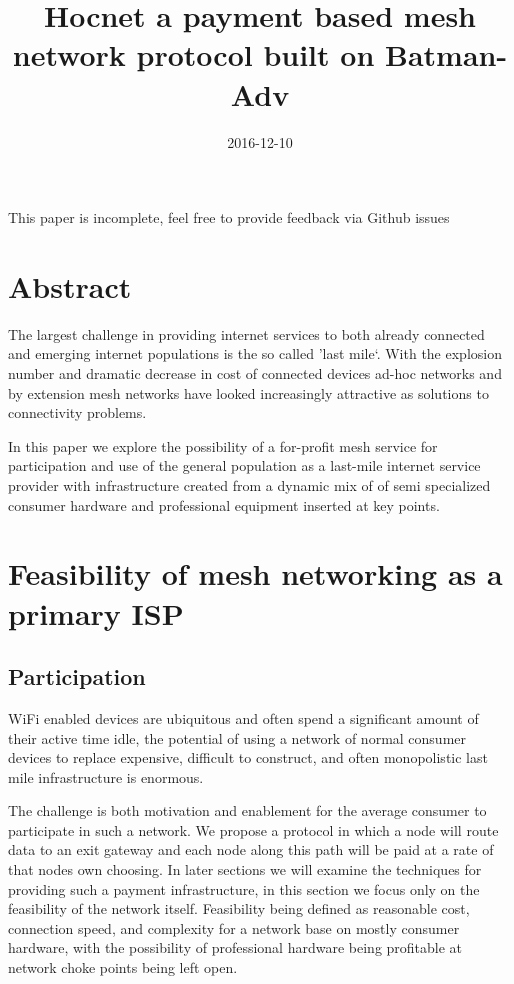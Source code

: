 \documentclass[11pt]{article}
\title{\textbf{Hocnet a payment based mesh network protocol built on Batman-Adv}}
\date{2016-12-10}
\begin{document}
\maketitle

This paper is incomplete, feel free to provide feedback via Github issues

\tableofcontents

\section{Abstract}

The largest challenge in providing internet services to both already connected and emerging internet populations is the so called 'last mile`. With the explosion number and dramatic decrease in cost of connected devices ad-hoc networks and by extension mesh networks have looked increasingly attractive as solutions to connectivity problems.

In this paper we explore the possibility of a for-profit mesh service for participation and use of the general population as a last-mile internet service provider with infrastructure created from a dynamic mix of of semi specialized consumer hardware and professional equipment inserted at key points. 

\section{Feasibility of mesh networking as a primary ISP} 

    \subsection{Participation}

    WiFi enabled devices are ubiquitous and often spend a significant amount of their active time idle, the potential of using a network of normal consumer devices to replace expensive, difficult to construct, and often monopolistic last mile infrastructure is enormous. 

    The challenge is both motivation and enablement for the average consumer to participate in such a network. We propose a protocol in which a node will route data to an exit gateway and each node along this path will be paid at a rate of that nodes own choosing. In later sections we will examine the techniques for providing such a payment infrastructure, in this section we focus only on the feasibility of the network itself. Feasibility being defined as reasonable cost, connection speed, and complexity for a network base on mostly consumer hardware, with the possibility of professional hardware being profitable at network choke points being left open. 
\end{document}
